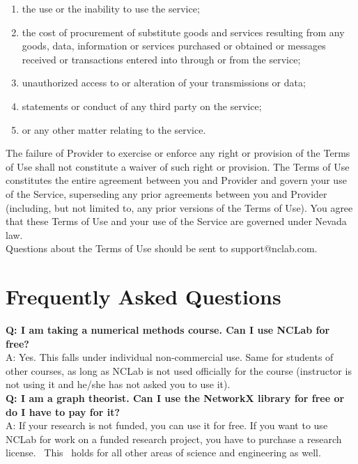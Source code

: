 \documentclass{article}
\begin{document}
\begin{enumerate}
\item the use or the inability to use the service; 
\item the cost of procurement of substitute goods and services resulting from any goods, data, 
      information or services purchased or obtained or messages received or transactions 
      entered into through or from the service; 
\item unauthorized access to or alteration of your transmissions or data; 
\item statements or conduct of any third party on the service; 
\item or any other matter relating to the service.
\end{enumerate}
The failure of Provider to exercise or enforce any right or provision of the Terms of
 Use shall not constitute a waiver of such right or provision. The Terms of Use 
constitutes the entire agreement between you and Provider and govern your use of 
the Service, superseding any prior agreements between you and Provider (including, 
but not limited to, any prior versions of the Terms of Use). You agree that these 
Terms of Use and your use of the Service are governed under Nevada law.\\

\noindent 
Questions about the Terms of Use should be sent to support@nclab.com.\\
 

\section*{Frequently Asked Questions}

\noindent 
{\bf Q: I am taking a numerical methods course. Can I use NCLab for free?}\\

\noindent 
A: Yes. This falls under individual non-commercial use. Same for students of other courses, 
as long as NCLab is not used officially for the course (instructor is not using it and he/she has not asked you to use it). \\

\noindent 
{\bf Q: I am a graph theorist. Can I use the NetworkX library for free or do I have to pay for it? }\\

\noindent 
A: If your research is not funded, you can use it for free. If you want to use NCLab 
for work on a funded research project, you have to purchase a research license.  This  holds for all other areas of science and engineering as well. \\
\end{document}
